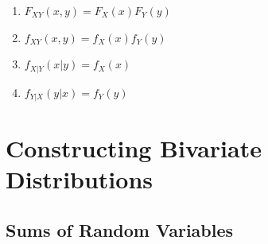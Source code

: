 \begin{multicols}{2}
\begin{enumerate}[resume*=calcrulesrv]
    \item $F _{X Y} (x, y) = F_X (x) F_Y (y)$
    \hfill \cite{statistics/book/Statistics-for-Data-Scientists/Maurits-Kaptein}

    \item $f _{X Y} (x, y) = f_X (x) f_Y (y)$
    \hfill \cite{statistics/book/Statistics-for-Data-Scientists/Maurits-Kaptein}

    \item $f _{X|Y} (x|y) = f_X (x)$
    \hfill \cite{statistics/book/Statistics-for-Data-Scientists/Maurits-Kaptein, mfml/book/mml/Deisenroth-Faisal-Ong}

    \item $f _{Y|X} (y|x) = f_Y (y)$
    \hfill \cite{statistics/book/Statistics-for-Data-Scientists/Maurits-Kaptein, mfml/book/mml/Deisenroth-Faisal-Ong}
\end{enumerate}
\end{multicols}











\section{Constructing Bivariate Distributions}

\subsection{Sums of Random Variables}

